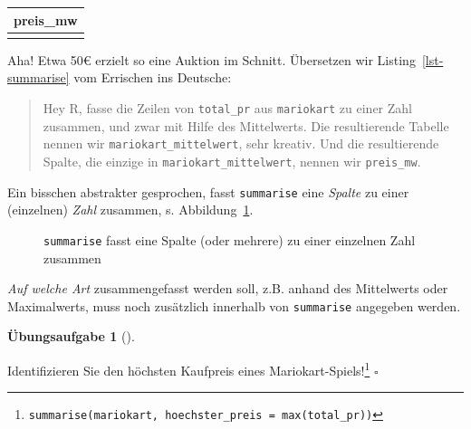 \documentclass[
  letterpaper,
  oneside,
  open=any]{scrbook}
\theoremstyle{definition}
\newtheorem{exercise}{Übungsaufgabe}[chapter]
\theoremstyle{definition}
\theoremstyle{definition}
\theoremstyle{remark}
\begin{document}
\begin{longtable}[]{@{}r@{}}
\toprule\noalign{}
preis\_mw \\
\midrule\noalign{}
\endhead
\bottomrule\noalign{}
\endlastfoot
50 \\
\end{longtable}

Aha! Etwa 50€ erzielt so eine Auktion im Schnitt. Übersetzen wir
Listing~\ref{lst-summarise} vom Errischen ins Deutsche:

\begin{quote}
{} Hey R, fasse die Zeilen von \texttt{total\_pr} aus
\texttt{mariokart} zu einer Zahl zusammen, und zwar mit Hilfe des
Mittelwerts. Die resultierende Tabelle nennen wir
\texttt{mariokart\_mittelwert}, sehr kreativ. Und die resultierende
Spalte, die einzige in \texttt{mariokart\_mittelwert}, nennen wir
\texttt{preis\_mw}.
\end{quote}

Ein bisschen abstrakter gesprochen, fasst \texttt{summarise} eine
\emph{Spalte} zu einer (einzelnen) \emph{Zahl} zusammen, s.
Abbildung~\ref{fig-desk-summ}.

\begin{figure}


\caption{\label{fig-desk-summ}\texttt{summarise} fasst eine Spalte (oder
mehrere) zu einer einzelnen Zahl zusammen}

\end{figure}%

\emph{Auf welche Art} zusammengefasst werden soll, z.B. anhand des
Mittelwerts oder Maximalwerts, muss noch zusätzlich innerhalb von
\texttt{summarise} angegeben werden.

\begin{exercise}[]\protect\hypertarget{exr-summarise}{}\label{exr-summarise}

Identifizieren Sie den höchsten Kaufpreis eines
Mariokart-Spiels!\footnote{\texttt{summarise(mariokart,\ hoechster\_preis\ =\ max(total\_pr))}}
\(\square\)

\end{exercise}
\end{document}
